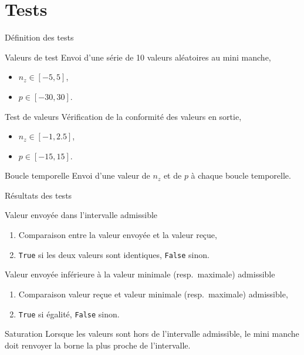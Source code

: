 \documentclass[footheight=2em]{beamer}
\begin{document}
\section{Tests}
\begin{frame}[t]{Définition des tests}
  \begin{block}{Valeurs de test}
    Envoi d'une série de 10 valeurs aléatoires au mini manche,
    \begin{itemize}
      \item \(n_z \in [-5, 5]\),
      \item \(p \in [-30, 30]\).
    \end{itemize}
  \end{block}
  \pause
  \begin{block}{Test de valeurs}
    Vérification de la conformité des valeurs en sortie,
    \begin{itemize}
      \item \(n_z \in [-1, 2.5]\),
      \item \(p \in [-15, 15]\).
    \end{itemize}
  \end{block}
  \begin{block}{Boucle temporelle}
    Envoi d'une valeur de \(n_z\) et de \(p\) à chaque boucle temporelle.
  \end{block}
\end{frame}

\begin{frame}[t]{Résultats des tests}
  \begin{block}{Valeur envoyée dans l'intervalle admissible}
    \begin{enumerate}
      \item Comparaison entre la valeur envoyée et la valeur reçue,
      \item \texttt{True} si les deux valeurs sont identiques, \texttt{False}
        sinon.
    \end{enumerate}
  \end{block}
  \pause
  \begin{block}{Valeur envoyée inférieure à la valeur minimale (resp.\
      maximale) admissible}
    \begin{enumerate}
      \item Comparaison valeur reçue et valeur minimale (resp.\ maximale)
        admissible,
      \item \texttt{True} si égalité, \texttt{False} sinon.
    \end{enumerate}
  \end{block}
  \pause
  \begin{block}{Saturation}
    Lorsque les valeurs sont hors de l'intervalle admissible, le mini manche doit
    renvoyer la borne la plus proche de l'intervalle.
  \end{block}
\end{frame}
\end{document}
